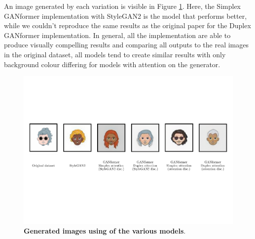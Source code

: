 \documentclass{article}
\begin{document}
An image generated by each variation is visible in Figure \ref{fig:summaryImgs}.
Here, the Simplex GANformer implementation with StyleGAN2 is the model that performs better, while we couldn't reproduce the same results as the original paper for the Duplex GANformer implementation. 
In general, all the implementation are able to produce visually compelling results and comparing all outputs to the real images in the original dataset, all models tend to create similar results with only background colour differing for models with attention on the generator.
\begin{figure}[htb]
	\centering
	\includegraphics[width=\linewidth]{imgAll}
	\caption{\textbf{Generated images using of the various models}.} 
	\label{fig:summaryImgs}
\end{figure}
\end{document}
